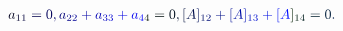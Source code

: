 \documentclass[12pt]{article}
\begin{document}
\makeatletter
\renewcommand*{\@textcolor}[3]{%
  \protect\leavevmode
  \begingroup
    \color#1{#2}#3%
  \endgroup
}
\makeatother
\begin{displaymath}
\begin{array} {c} \mathcolor[RGB]{0,0,15}{\textstyle} { \mathcolor[RGB]{0,0,30}{a} _ { \mathcolor[RGB]{0,0,45}{1} \mathcolor[RGB]{0,0,60}{1} } \mathcolor[RGB]{0,0,75}{=} \mathcolor[RGB]{0,0,90}{0} \mathcolor[RGB]{0,0,105}{,} \mathcolor[RGB]{0,0,120}{a} _ { \mathcolor[RGB]{0,0,135}{2} \mathcolor[RGB]{0,0,150}{2} } \mathcolor[RGB]{0,0,165}{+} \mathcolor[RGB]{0,0,180}{a} _ { \mathcolor[RGB]{0,0,195}{3} \mathcolor[RGB]{0,0,210}{3} } \mathcolor[RGB]{0,0,225}{+} \mathcolor[RGB]{0,0,240}{a} _ { \mathcolor[RGB]{0,0,255}{4} \mathcolor[RGB]{0,15,0}{4} } \mathcolor[RGB]{0,15,15}{=} \mathcolor[RGB]{0,15,30}{0} \mathcolor[RGB]{0,15,45}{,} { \mathcolor[RGB]{0,15,60}{[} } \mathcolor[RGB]{0,15,75}{A} \mathcolor[RGB]{0,15,90}{]} _ { \mathcolor[RGB]{0,15,105}{1} \mathcolor[RGB]{0,15,120}{2} } \mathcolor[RGB]{0,15,135}{+} { \mathcolor[RGB]{0,15,150}{[} } \mathcolor[RGB]{0,15,165}{A} \mathcolor[RGB]{0,15,180}{]} _ { \mathcolor[RGB]{0,15,195}{1} \mathcolor[RGB]{0,15,210}{3} } \mathcolor[RGB]{0,15,225}{+} { \mathcolor[RGB]{0,15,240}{[} } \mathcolor[RGB]{0,15,255}{A} \mathcolor[RGB]{0,30,0}{]} _ { \mathcolor[RGB]{0,30,15}{1} \mathcolor[RGB]{0,30,30}{4} } \mathcolor[RGB]{0,30,45}{=} \mathcolor[RGB]{0,30,60}{0} \mathcolor[RGB]{0,30,75}{.} } \end{array}
\end{displaymath}
\end{document}
